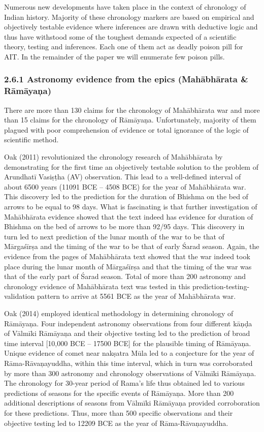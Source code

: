 Numerous new developments have taken place in the context of chronology of Indian history. Majority of these chronology markers are based on empirical and objectively testable evidence where inferences are drawn with deductive logic and thus have withstood some of the toughest demands expected of a scientific theory, testing and inferences. Each one of them act as deadly poison pill for AIT. In the remainder of the paper we will enumerate few poison pills.

\subsubsection*{2.6.1 Astronomy evidence from the epics (Mahābhārata \& Rāmāyaņa)}

There are more than 130 claims for the chronology of Mahābhārata war and more than 15 claims for the chronology of Rāmāyaņa. Unfortunately, majority of them plagued with poor comprehension of evidence or total ignorance of the logic of scientific method.

Oak (2011) revolutionized the chronology research of Mahābhārata by demonstrating for the first time an objectively testable solution to the problem of Arundhatī Vasiṣṭha (AV) observation. This lead to a well-defined interval of about 6500 years (11091 BCE – 4508 BCE) for the year of Mahābhārata war. This discovery led to the prediction for the duration of Bhishma on the bed of arrows to be equal to 98 days. What is fascinating is that further investigation of Mahābhārata evidence showed that the text indeed has evidence for duration of Bhishma on the bed of arrows to be more than 92/95 days. This discovery in turn led to next prediction of the lunar month of the war to be that of Mārgaśīrṣa and the timing of the war to be that of early Śarad season. Again, the evidence from the pages of Mahābhārata text showed that the war indeed took place during the lunar month of Mārgaśīrṣa and that the timing of the war was that of the early part of Śarad season. Total of more than 200 astronomy and chronology evidence of Mahābhārata text was tested in this prediction-testing-validation pattern to arrive at 5561 BCE as the year of Mahābhārata war.

Oak (2014) employed identical methodology in determining chronology of Rāmāyaņa. Four independent astronomy observations from four different kāņḍa of Vālmīki Rāmāyaņa and their objective testing led to the prediction of broad time interval [10,000 BCE – 17500 BCE] for the plausible timing of Rāmāyaņa. Unique evidence of comet near nakṣatra Mūla led to a conjecture for the year of Rāma-Rāvaņayuddha, within this time interval, which in turn was corroborated by more than 300 astronomy and chronology observations of Vālmīki Rāmāyaņa. The chronology for 30-year period of Rama’s life thus obtained led to various predictions of seasons for the specific events of Rāmāyaņa. More than 200 additional descriptions of seasons from Vālmīki Rāmāyaņa provided corroboration for these predictions. Thus, more than 500 specific observations and their objective testing led to 12209 BCE as the year of Rāma-Rāvaņayuddha.

